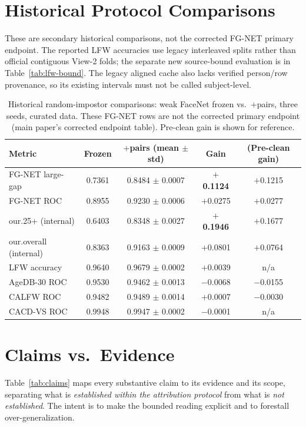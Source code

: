 \documentclass[journal]{IEEEtran}
\begin{document}
\section{Historical Protocol Comparisons}\label{sec:legacy-main}
These are secondary historical comparisons, not the corrected FG-NET primary endpoint.
The reported LFW accuracies use legacy interleaved splits rather than official contiguous
View-2 folds; the separate new source-bound evaluation is in Table~\ref{tab:lfw-bound}.
The legacy aligned cache also lacks
verified person/row provenance, so its existing intervals must not be called subject-level.
\begin{table}[!t]
\renewcommand{\arraystretch}{1.2}
\caption{Historical random-impostor comparisons: weak FaceNet frozen vs.\ $+$pairs, three seeds, curated data. These FG-NET rows are not the corrected primary endpoint (main paper's corrected endpoint table). Pre-clean gain is shown for reference.}
\label{tab:legacy-main}
\centering
\footnotesize
\begin{tabular}{@{}lcccc@{}}
\toprule
Metric & Frozen & $+$pairs (mean $\pm$ std) & Gain & (Pre-clean gain) \\
\midrule
FG-NET large-gap & 0.7361 & 0.8484 $\pm$ 0.0007 & \textbf{$+$0.1124} & $+$0.1215 \\
FG-NET ROC & 0.8955 & 0.9230 $\pm$ 0.0006 & $+$0.0275 & $+$0.0277 \\
our.25+ (internal) & 0.6403 & 0.8348 $\pm$ 0.0027 & \textbf{$+$0.1946} & $+$0.1677 \\
our.overall (internal) & 0.8363 & 0.9163 $\pm$ 0.0009 & $+$0.0801 & $+$0.0764 \\
LFW accuracy & 0.9640 & 0.9679 $\pm$ 0.0002 & $+$0.0039 & n/a \\
AgeDB-30 ROC & 0.9530 & 0.9462 $\pm$ 0.0013 & $-$0.0068 & $-$0.0155 \\
CALFW ROC & 0.9482 & 0.9489 $\pm$ 0.0014 & $+$0.0007 & $-$0.0030 \\
CACD-VS ROC & 0.9948 & 0.9947 $\pm$ 0.0002 & $-$0.0001 & n/a \\
\bottomrule
\end{tabular}
\end{table}

\section{Claims vs.\ Evidence}\label{sec:claims}
Table~\ref{tab:claims} maps every substantive claim to its evidence and its scope, separating what
is \emph{established within the attribution protocol} from what is \emph{not established}. The intent
is to make the bounded reading explicit and to forestall over-generalization.
\end{document}
